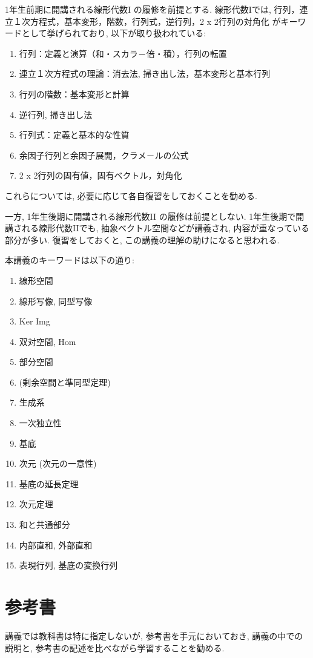 1年生前期に開講される線形代数I
の履修を前提とする.
線形代数Iでは,
行列，連立１次方程式，基本変形，階数，行列式，逆行列，2 x 2行列の対角化
がキーワードとして挙げられており,
以下が取り扱われている:
\begin{enumerate}
\item 行列：定義と演算（和・スカラ－倍・積），行列の転置
\item 連立１次方程式の理論：消去法, 掃き出し法，基本変形と基本行列
\item 行列の階数：基本変形と計算
\item 逆行列, 掃き出し法
\item 行列式：定義と基本的な性質
\item 余因子行列と余因子展開，クラメ－ルの公式
\item 2 x 2行列の固有値，固有ベクトル，対角化
\end{enumerate}
これらについては,
必要に応じて各自復習をしておくことを勧める.


一方,
1年生後期に開講される線形代数II
の履修は前提としない.
1年生後期で開講される線形代数IIでも,
抽象ベクトル空間などが講義され,
内容が重なっている部分が多い.
復習をしておくと,
この講義の理解の助けになると思われる.

本講義のキーワードは以下の通り:
\begin{enumerate}
\item 線形空間
\item 線形写像, 同型写像
\item Ker Img
\item 双対空間, Hom
\item 部分空間
\item (剰余空間と準同型定理)
\item 生成系
\item 一次独立性
\item 基底
\item 次元 (次元の一意性)
\item 基底の延長定理
\item 次元定理
\item 和と共通部分
\item 内部直和, 外部直和
\item 表現行列, 基底の変換行列
\end{enumerate}

\section{参考書}
講義では教科書は特に指定しないが,
参考書を手元においておき,
講義の中での説明と,
参考書の記述を比べながら学習することを勧める.

